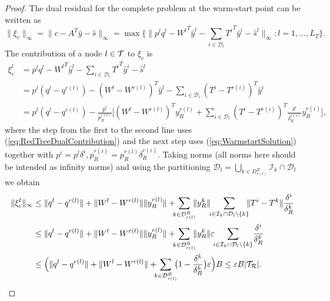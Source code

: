 \begin{proof}
The dual residual for the complete problem at the warm-start point 
can be written as
\[
  \|\xi_c\|_\infty = \|c -A^T\hat y -\hat s \|_\infty 
                   = \max\{\|p^{l}q^{l}
                   - {W^{l}}^T\hat y^{l} 
                   - \sum_{i \in \mathcal{D}_{l}} {T^{i}}^T\hat y^{i}
                   - \hat s^{l}
  \|_\infty : l = 1,\ldots,L_T\}.
\]
%
The contribution of a node $l \in \mathcal{T}$ to $\xi_c$ is
\[
\begin{split}
  \xi_c^{l} 
 & = p^{l} q^{l} - {W^{l}}^T\hat y^{l}
     - \sum_{i\in \mathcal{D}_{l}} {T^i}^T \!\hat y^{i} -\hat s^{l} \\
 & = p^{l}(q^{l}\!-\! q^{r(l)})
     - (W^{l} \!-\! W^{r(l)})^T \hat y^{l}
     -\sum_{i \in \mathcal{D}_{l}} (T^{i} \!-\! T^{r(i)})^T\hat y^i \\
 & = p^{l}(q^{l} \!-\! q^{r(l)})
     - \frac{p^{l}}{p^{r(l)}_R} \Big[
       (W^{l} \!-\! W^{r(l)})^T y^{r(l)}_R
       +\sum_{i\in \mathcal{D}_{l}} %
           (T^{i} \!-\! T^{r(i)})^T 
           \frac{\delta^i}{\delta^{r(i)}_R} y^{r(i)}_R \Big],
\end{split}
\]
where the step from the first to the second line uses 
(\ref{eq:RedTreeDualContribution}) and the next step uses
(\ref{eq:WarmstartSolution}) together with $p^i = p^l\delta^i,
p_R^{r(i)} = p_R^{r(l)}\delta_R^{r(i)}$.
%
Taking norms (all norms here should be intended as infinity norms)
and using the partitioning 
$\mathcal{D}_l = \bigcup_{k\in D^R_{r(l)}} \mathcal{I}_k\cap\mathcal{D}_l$
we obtain
\[
\begin{split}
  \| \xi_c^{l} \|_\infty
  & \le \|q^{l} - q^{r(l)}\| 
        + \|W^{l} - W^{r(l)}\| \| y^{r(l)}_R\|
        + \!\!\! \sum_{k\in \mathcal{D}_{r(l)}^R} \!\!\! \| y^{k}_R \| \!\!
          \sum_{i\in \mathcal{I}_k \cap \mathcal{D}_{l}\setminus \{k\} }
	  \!\!\! \| T^{i} - T^{k} \| \frac{\delta^i}{\delta_R^k} \\
  & \le \|q^{l} - q^{r(l)}\| 
        + \|W^{l} - W^{r(l)}\| \| y^{r(l)}_R\|
        + \!\!\! \sum_{k\in \mathcal{D}_{r(l)}^R} \!\!\! \| y^{k}_R \|
          \varepsilon \!\!
          \sum_{i\in \mathcal{I}_k \cap \mathcal{D}_{l}\setminus \{k\} }
	  \! \frac{\delta^i}{\delta_R^k} \\
  & \le \Big( \|q^{l} - q^{r(l)}\| 
        + \|W^{l} - W^{r(l)}\|
        + \!\!\! \sum_{k\in \mathcal{D}_{r(l)}^R} \!\!\!
	  \big( 1 - \frac{\delta^k}{\delta_R^k} \big) \varepsilon \Big) B
    \le \varepsilon B |\Rtree|.
        \qedhere
\end{split}
\]
%
\end{proof}


